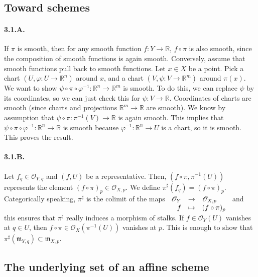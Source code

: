 \documentclass{article}
\newcommand{\R}{\mathbb{R}}
\newcommand{\applic}[4]{\begin{array}[t]{rcl}
#1 & \to & #2 \\
#3 & \mapsto & #4
\end{array}}
\newcommand{\Osheaf}{\mathscr{O}}
\newcommand{\m}{\mathfrak{m}}
\begin{document}
\section{}

\subsection{Toward schemes}

\paragraph{3.1.A.} If $\pi$ is smooth, then for any smooth function $f : Y \to \R$, $f \circ \pi$ is also smooth, since the composition of smooth functions is again smooth. Conversely, assume that smooth functions pull back to smooth functions. Let $x \in X$ be a point. Pick a chart $(U,\varphi : U \to \R^n)$ around $x$, and a chart $(V,\psi : V \to \R^m)$ around $\pi(x)$. We want to show $\psi \circ \pi \circ \varphi^{-1} : \R^n \to \R^m$ is smooth. To do this, we can replace $\psi$ by its coordinates, so we can just check this for $\psi : V \to \R$. Coordinates of charts are smooth (since charts and projections $\R^m \to \R$ are smooth). We know by assumption that $\psi \circ \pi : \pi^{-1}(V) \to \R$ is again smooth. This implies that $\psi \circ \pi \circ \varphi^{-1} : \R^n \to \R$ is smooth because $\varphi^{-1} : \R^n\to U$ is a chart, so it is smooth. This proves the result.

\paragraph{3.1.B.} Let $f_q \in \Osheaf_{Y,q}$ and $(f,U)$ be a representative. Then, $(f\circ \pi, \pi^{-1}(U))$ represents the element $(f\circ \pi)_p \in \Osheaf_{X,p}$. We define $\pi^\sharp (f_q) = (f \circ \pi)_p$. Categorically speaking, $\pi^\sharp$ is the colimit of the maps $\applic{\Osheaf_Y}{\Osheaf_{X,p}}{f}{(f\circ \pi)_p}$ and this ensures that $\pi^\sharp$ really induces a morphism of stalks. If $f \in \Osheaf_Y(U)$ vanishes at $q \in U$, then $f \circ \pi \in \Osheaf_X (\pi^{-1}(U))$ vanishes at $p$. This is enough to show that $\pi^\sharp (\m_{Y,q}) \subset \m_{X,p}$.

\subsection{The underlying set of an affine scheme}
\end{document}
